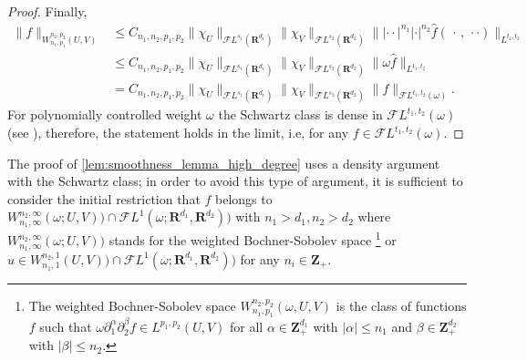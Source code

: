 \documentclass[a4paper]{article}
\newcommand{\rr}[1]{\mathbf{R}^{#1}}
\newcommand{\rrI}{\rr{d_1}}
\newcommand{\rrII}{\rr{d_2}}
\newcommand{\zzp}[1]{\mathbf{Z}_+^{#1}}
\newcommand{\abs}[1]{| #1|}     %
\newcommand{\cdo}{\, \cdot \, }
\newcommand{\norm}[2]{\|#1\|_{#2}}
\newcommand{\F}[0]{\mathscr{F}}
\newcommand{\FL}[1]{\F L^{#1}}
\newcommand{\chF}[1]{\chi_{#1}}
\numberwithin{equation}{section}
\theoremstyle{remark}
\begin{document}
\begin{proof}
    Finally,
    \begin{align*}
        \norm{f}{W_{n_1,p_1}^{n_2, p_2}(U, V)}
        &\leq C_{n_1,n_2,p_1,p_2}
        \norm{{\chF{U}}}{\FL{s_1}(\rrI)}
        \norm{{\chF{V}}}{\FL{s_2}(\rrII)}
        \norm{\abs{\cdot\cdot}^{n_1}\abs{\cdot}^{n_2} \widehat{f}(\cdo, \, \cdot\cdot)}{L^{t_1,t_2}}
        \\
        &\leq C_{n_1,n_2,p_1,p_2}
        \norm{{\chF{U}}}{\FL{s_1}(\rrI)}
        \norm{{\chF{V}}}{\FL{s_2}(\rrII)}
        \norm{\omega\widehat{f}}{L^{t_1,t_2}}
        \\
        &= C_{n_1,n_2,p_1,p_2}
        \norm{{\chF{U}}}{\FL{s_1}(\rrI)}
        \norm{{\chF{V}}}{\FL{s_2}(\rrII)}
        \norm{f}{\FL{t_1,t_2}(\omega)}.
    \end{align*}
    For polynomially controlled weight $\omega$ the Schwartz class is dense in $\FL{t_1,t_2}(\omega)$
    (see \cite[Theorem 10.1.7]{Hormander05AnalysisLinearPartial}),
    therefore, the statement holds in the limit, i.e, for any $f\in\FL{t_1,t_2}(\omega)$.
\end{proof}

The proof of \cref{lem:smoothness_lemma_high_degree}
uses a density argument with the Schwartz class;
in order to avoid this type of argument,
it is sufficient to consider the initial restriction that
$f$ belongs to
$ W_{n_1, \infty}^{n_2,\infty}
            (\omega; U, V))\cap \FL{1}(\omega; \rr{d_1},\rr{d_2}))$
            with \(n_1>d_1, n_2>d_2\) 
where $ W_{n_1, \infty}^{n_2,\infty}
            (\omega; U,  V))$
            stands for the weighted Bochner-Sobolev space
            \footnote{The weighted Bochner-Sobolev space $W_{n_1,p_1}^{n_2,p_2}(\omega,U,V)$ is the class of functions $f$ such that $\omega\partial_1^\alpha\partial_2^\beta f\in L^{p_1,p_2}(U,V)$ for all $\alpha\in\zzp{d_1}$ with $\abs{\alpha}\leq n_1$ and $\beta\in\zzp{d_2}$ with $\abs{\beta}\leq n_2$.}
or
$u \in  W_{n_1, 1}^{n_2,1}(U, V))\cap\FL{1}(\omega; \rrI,\rrII))$
            for any \(n_i\in \zzp{}\).
\end{document}
